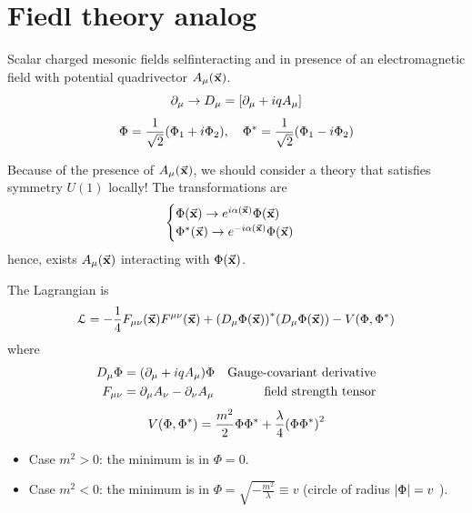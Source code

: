 \documentclass[../main/main.tex]{subfiles}
\begin{document}
\section{Fiedl theory analog}
Scalar charged mesonic fields selfinteracting and in presence of an electromagnetic field with potential quadrivector \( A_ \mu  ( \va{x}) \).
\begin{equation}
  \partial_ \mu  \rightarrow  D _ \mu = \qty[ \partial_ \mu  + i q A _ \mu  ]
\end{equation}
\begin{equation}
  \Phi = \frac{1}{\sqrt{2} } \qty(\Phi _1 + i \Phi _2), \quad \Phi ^* = \frac{1}{\sqrt{2} } \qty(\Phi _1 - i \Phi _2)
\end{equation}
\begin{remark}
Because of the presence of \( A _ \mu (\va{x}) \), we should consider a theory that satisfies symmetry \( U(1) \) locally!
The transformations are
\begin{equation}
  \begin{cases}
   \Phi  ( \va{x} ) \rightarrow e^{i \alpha (\va{x})} \Phi (\va{x}) \\
  \Phi^*  ( \va{x} ) \rightarrow e^{-i \alpha (\va{x})} \Phi (\va{x})
  \end{cases}
\end{equation}
hence, exists \( A _ \mu (\va{x}) \) interacting with \( \Phi (\va{x}) \).

The Lagrangian is
\begin{equation}
  \mathcal{L} = - \frac{1}{4} F_ {\mu  \nu } (\va{x}) F ^{ \mu \nu } (\va{x})
  + \qty(D _ \mu  \Phi (\va{x}))^* \qty(D _ \mu \Phi (\va{x}))
  - V (\Phi ,\Phi ^*)
\end{equation}
where
\begin{subequations}
\begin{align}
  D_ \mu \Phi  &= \qty(\partial_ \mu  + i q A _ \mu  ) \Phi   & \text{Gauge-covariant derivative}\\
  F_ { \mu \nu } &= \partial_ \mu  A _ \nu  - \partial _ \nu  A _ \mu & \text{field strength tensor}
\end{align}
\end{subequations}
\begin{equation}
  V (\Phi , \Phi ^*) = \frac{m^2}{2} \Phi \Phi ^* + \frac{\lambda }{4} \qty(\Phi \Phi ^*)^2
\end{equation}
\begin{itemize}
\item Case \( m^2 >0 \): the minimum is in \( \Phi =0 \).
\item Case \( m^2 < 0 \): the minimum is in \( \Phi = \sqrt{- \frac{m^2}{\lambda }} \equiv v  \)    (circle of radius \( \abs{\Phi } = v \) ).
\end{itemize}
\end{remark}
\end{document}
